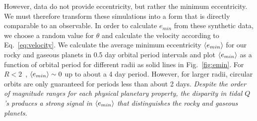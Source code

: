 However, \kepler data do not provide eccentricity, but rather the
minimum eccentricity. We must therefore transform these simulations
into a form that is directly comparable to an observable. In order to
calculate $e_{min}$ from these synthetic data, we choose a random
value for $\theta$ and calculate the velocity according to
Eq.~\ref{eq:velocity}. We calculate the average minimum eccentricity
$\left< e_{min} \right>$ for our rocky and gaseous planets in 0.5 day orbital
period intervals and plot $\left< e_{min} \right>$ as a function of orbital
period for different radii as solid lines in Fig.~\ref{fig:emin}. For
$R < 2$~\rearth, $\left< e_{min} \right>
\sim 0$ up to about a 4 day period. However, for larger radii,
circular orbits are only guaranteed for periods less than about 2
days. \textit{Despite the order of magnitude ranges for each physical
  planetary property, the disparity in tidal $Q$'s produces a strong
  signal in $\left< e_{min} \right>$ that distinguishes the rocky and gaseous
  planets. }


